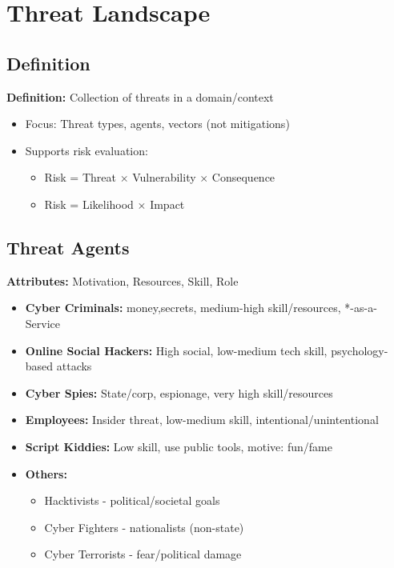\section{Threat Landscape}
\subsection{Definition}
{
\textbf{Definition:} Collection of threats in a domain/context
\begin{itemize}[noitemsep]
  \item Focus: Threat types, agents, vectors (not mitigations)
  \item Supports risk evaluation:
  \begin{itemize}[noitemsep]
    \item Risk = Threat $\times$ Vulnerability $\times$ Consequence
    \item Risk = Likelihood $\times$ Impact
  \end{itemize}
\end{itemize}
}

\subsection{Threat Agents}
{
\textbf{Attributes:} Motivation, Resources, Skill, Role

\begin{itemize}[noitemsep]
  \item \textbf{Cyber Criminals:}  money,secrets, medium-high skill/resources, *-as-a-Service
  \item \textbf{Online Social Hackers:} High social, low-medium tech skill, psychology-based attacks
  \item \textbf{Cyber Spies:} State/corp, espionage, very high skill/resources
  \item \textbf{Employees:} Insider threat, low-medium skill, intentional/unintentional
  \item \textbf{Script Kiddies:} Low skill, use public tools, motive: fun/fame
  \item \textbf{Others:} 
  \begin{itemize}[noitemsep]
    \item Hacktivists - political/societal goals
    \item Cyber Fighters - nationalists (non-state)
    \item Cyber Terrorists - fear/political damage
  \end{itemize}
\end{itemize}
}

